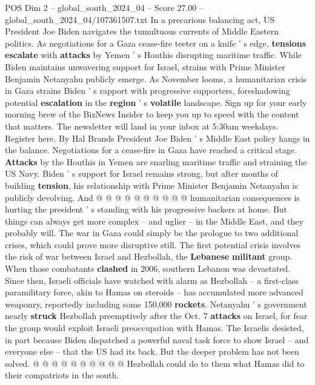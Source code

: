 \begin{textsample}{POS Dim 2 – global\_south\_2024\_04 – Score 27.00 – global\_south\_2024\_04/107361507.txt}  \label{ex:f2_pos_046}
In a precarious balancing act, US President Joe Biden navigates the tumultuous currents of Middle Eastern politics.
As negotiations for a Gaza cease-fire teeter on a knife ' s edge, \textbf{tensions} \textbf{escalate} with \textbf{attacks} by Yemen ' s Houthis disrupting maritime traffic.
While Biden maintains unwavering support for Israel, strains with Prime Minister Benjamin Netanyahu publicly emerge.
As November looms, a humanitarian crisis in Gaza strains Biden ' s rapport with progressive supporters, foreshadowing potential \textbf{escalation} in the \textbf{region} ' s \textbf{volatile} landscape.
Sign up for your early morning brew of the BizNews Insider to keep you up to speed with the content that matters.
The newsletter will land in your inbox at 5:30am weekdays.
Register here.
By Hal Brands President Joe Biden ' s Middle East policy hangs in the balance.
Negotiations for a cease-fire in Gaza have reached a critical stage. \textbf{Attacks} by the Houthis in Yemen are snarling maritime traffic and straining the US Navy.
Biden ' s support for Israel remains strong, but after months of building \textbf{tension}, his relationship with Prime Minister Benjamin Netanyahu is publicly devolving.
And @ @ @ @ @ @ @ @ @ @ humanitarian consequences is hurting the president ' s standing with his progressive backers at home.
But things can always get more complex -- and uglier -- in the Middle East, and they probably will.
The war in Gaza could simply be the prologue to two additional crises, which could prove more disruptive still.
The first potential crisis involves the risk of war between Israel and Hezbollah, the \textbf{Lebanese} \textbf{militant} group.
When those combatants \textbf{clashed} in 2006, southern Lebanon was devastated.
Since then, Israeli officials have watched with alarm as Hezbollah -- a first-class paramilitary force, akin to Hamas on steroids -- has accumulated more advanced weaponry, reportedly including some 150,000 \textbf{rockets}.
Netanyahu ' s government nearly \textbf{struck} Hezbollah preemptively after the Oct. 7 \textbf{attacks} on Israel, for fear the group would exploit Israeli preoccupation with Hamas.
The Israelis desisted, in part because Biden dispatched a powerful naval task force to show Israel -- and everyone else -- that the US had its back.
But the deeper problem has not been solved. @ @ @ @ @ @ @ @ @ @ Hezbollah could do to them what Hamas did to their compatriots in the south.

\end{textsample}
